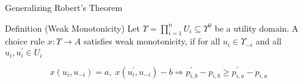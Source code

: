 \begin{frame}{Generalizing Robert's Theorem}
\begin{block}{Definition (Weak Monotonicity)}
Let $\Upsilon = \prod _{i=1}^{n}U_{i} \subseteq \Upsilon ^{0}$ be a utility domain. A choice rule $x:\Upsilon \rightarrow A$ satisfies weak monotonicity, if for all $u_{i} \in \Upsilon _{-i}$ and all $u_{i},u_{i}^{'}\in U_{i}$

$$x(u_{i},u_{-i}) = a, \; x(u_{i}^{'},u_{-i}) - b \Rightarrow p_{i,b}^{'} - p_{i,b} \geq p_{i,a}^{'} - p_{i,a}$$
\end{block}
\end{frame}

